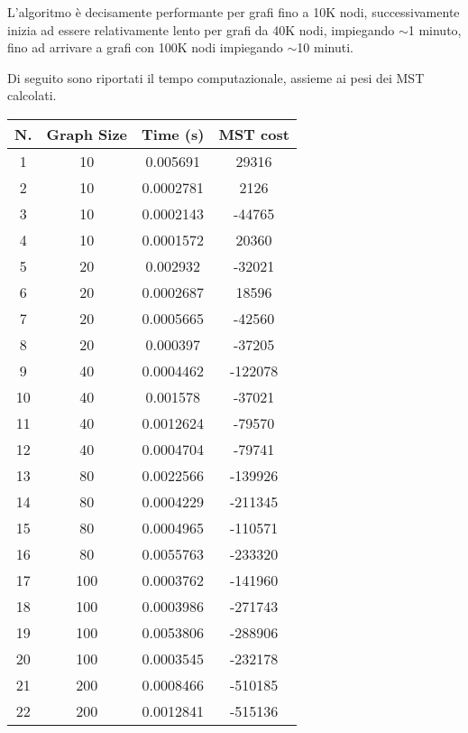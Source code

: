 L'algoritmo è decisamente performante per grafi fino a 10K nodi, successivamente inizia ad essere relativamente lento per grafi da 40K nodi, impiegando $\sim$1 minuto, fino ad arrivare a grafi con 100K nodi impiegando $\sim$10 minuti.\acapo

Di seguito sono riportati il tempo computazionale, assieme ai pesi dei MST calcolati.
\begin{table}[H]
	\centering
	\begin{tabular}{|c|c|c|c|}
		\hline
		\textbf{N.} & \textbf{Graph Size} & \textbf{Time (s)} & \textbf{MST cost}\\ 
		\hline
		1 & 10 & 0.005691 & 29316\\
		\hline
		2 & 10 & 0.0002781 & 2126\\
		\hline
		3 & 10 & 0.0002143 & -44765\\
		\hline
		4 & 10 & 0.0001572 & 20360\\
		\hline\hline
		5 & 20 & 0.002932 & -32021\\
		\hline
		6 & 20 & 0.0002687 & 18596\\
		\hline
		7 & 20 & 0.0005665 & -42560\\
		\hline
		8 & 20 & 0.000397 & -37205\\
		\hline\hline
		9 & 40 & 0.0004462 & -122078\\
		\hline
		10 & 40 & 0.001578 & -37021\\
		\hline
		11 & 40 & 0.0012624 & -79570\\
		\hline
		12 & 40 & 0.0004704 & -79741\\
		\hline\hline
		13 & 80 & 0.0022566 & -139926\\
		\hline
		14 & 80 & 0.0004229 & -211345\\
		\hline
		15 & 80 & 0.0004965 & -110571\\
		\hline
		16 & 80 & 0.0055763 & -233320\\
		\hline\hline
		17 & 100 & 0.0003762 & -141960\\
		\hline
		18 & 100 & 0.0003986 & -271743\\
		\hline
		19 & 100 & 0.0053806 & -288906\\
		\hline
		20 & 100 & 0.0003545 & -232178\\
		\hline\hline
		21 & 200 & 0.0008466 & -510185\\
		\hline
		22 & 200 & 0.0012841 & -515136\\

\end{tabular}
\end{table}
